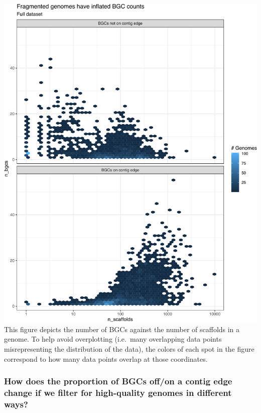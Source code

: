 \documentclass[
]{article}
\begin{document}
\includegraphics{analysis_files/figure-latex/unnamed-chunk-3-1.pdf} This
figure depicts the number of BGCs against the number of scaffolds in a
genome. To help avoid overplotting (i.e.~many overlapping data points
misrepresenting the distribution of the data), the colors of each spot
in the figure correspond to how many data points overlap at those
coordinates.

\hypertarget{how-does-the-proportion-of-bgcs-offon-a-contig-edge-change-if-we-filter-for-high-quality-genomes-in-different-ways}{%
\subsubsection{How does the proportion of BGCs off/on a contig edge
change if we filter for high-quality genomes in different
ways?}\label{how-does-the-proportion-of-bgcs-offon-a-contig-edge-change-if-we-filter-for-high-quality-genomes-in-different-ways}}
\end{document}
